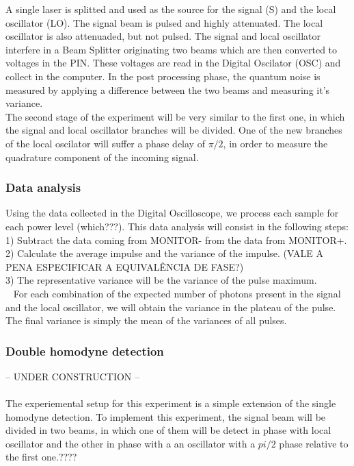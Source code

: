 %
A single laser is splitted and used as the source for the signal (S) and the local oscillator (LO). The signal beam is pulsed and highly attenuated. The local oscillator is also attenuaded, but not pulsed. The signal and local oscillator interfere in a Beam Splitter originating two beams which are then converted to voltages in the PIN. These voltages are read in the Digital Oscilator (OSC) and collect in the computer. In the post processing phase, the quantum noise is measured by applying a difference between the two beams and measuring it's variance.
\\
The second stage of the experiment will be very similar to the first one, in which the signal and local oscillator branches will be divided. One of the new branches of the local oscilator will suffer a phase delay of $\pi/2$, in order to measure the quadrature component of the incoming signal.\\
%
%
\subsubsection{Data analysis}
%
Using the data collected in the Digital Oscilloscope, we process each sample for each power level (which???).
This data analysis will consist in the following steps:
1) Subtract the data coming from MONITOR- from the data from MONITOR+.\\
2) Calculate the average impulse and the variance of the impulse. (VALE A PENA ESPECIFICAR A EQUIVALÊNCIA DE FASE?)\\
3) The representative variance will be the variance of the pulse maximum.\\\
%
For each combination of the expected number of photons present in the signal and the local oscillator, we will obtain the variance in the plateau of the pulse. The final variance is simply the mean of the variances of all pulses.
%

\subsubsection{Double homodyne detection}
%
-- UNDER CONSTRUCTION --\\
\\
The experiemental setup for this experiment is a simple extension of the single homodyne detection. To implement this experiment, the signal beam will be divided in two beams, in which one of them will be detect in phase with local oscillator and the other in phase with a an oscillator with a $pi/2$ phase relative to the first one.????
%

